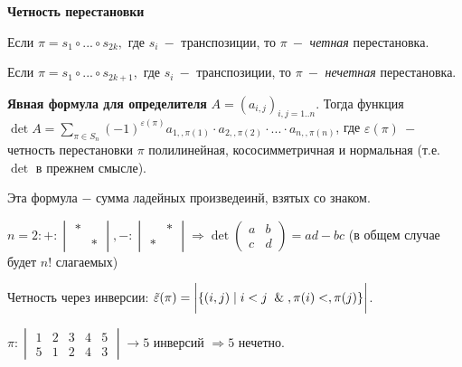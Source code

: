 \begin{definition}
    \textbf{Четность перестановки}

    Если $\pi=s_1\circ ...\circ s_{2k},$ где $ s_i\ -$ транспозиции, то $\pi\ -$ \textit{четная} перестановка.

    Если $\pi=s_1\circ ...\circ s_{2k+1},$ где $ s_i\ -$ транспозиции, то $\pi\ -$ \textit{нечетная} перестановка.
\end{definition}

\begin{theorem}
    \textbf{Явная формула для определителя}
    $A=(a_{i,j})_{i,j=1..n}$. Тогда функция $\det A=\sum\limits_{\pi\in S_n}(-1)^{\varepsilon(\pi)}a_{1,,\pi(1)}\cdot a_{2,,\pi(2)}\cdot...\cdot a_{n,,\pi(n)}$, где $\varepsilon(\pi)\ -$ четность перестановки $\pi$ полилинейная, кососимметричная и нормальная (т.е. $\det$ в прежнем смысле).
\end{theorem}

\begin{remark}
    Эта формула $-$ сумма ладейных произведеинй, взятых со знаком.
\end{remark}

\begin{example}
    $n=2:+: \begin{vmatrix} * &  \\ & *
    \end{vmatrix}, -: \begin{vmatrix} & *   \\ * &
    \end{vmatrix}\Rightarrow \det \begin{pmatrix}
                                      a & b  \\ c & d
    \end{pmatrix}=ad-bc$ (в общем случае будет $n!$ слагаемых)
\end{example}

\begin{definition}
    Четность через инверсии: $\Tilde{\varepsilon}(\pi)=\bigg|\{(i,j)\mid i<j \And ,\pi(i)<,\pi(j)\}\bigg|$.
\end{definition}

\begin{example}
    $\pi:\begin{vmatrix} 1 & 2 & 3 & 4 & 5 \\ 5 & 1 & 2 & 4 & 3
    \end{vmatrix}\rightarrow 5$ инверсий $\Rightarrow 5$ нечетно.
\end{example}

